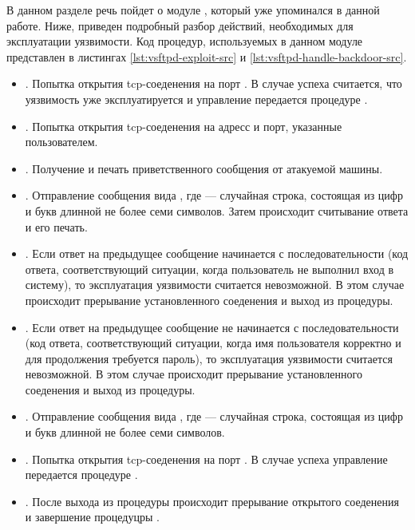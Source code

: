 В данном разделе речь пойдет о модуле , который уже упоминался в данной работе. Ниже, приведен подробный разбор действий, необходимых для эксплуатации уязвимости. Код процедур, используемых 
в данном модуле представлен в листингах \ref{lst:vsftpd-exploit-src} и \ref{lst:vsftpd-handle-backdoor-src}.
\begin{itemize}
    \item {}. Попытка открытия tcp-соеденения на порт . В случае успеха считается, что уязвимость уже эксплуатируется и управление передается процедуре .
    \item {}. Попытка открытия tcp-соеденения на адресс и порт, указанные пользователем.
    \item {}. Получение и печать приветственного сообщения от атакуемой машины.
    \item {}. Отправление сообщения вида , где  --- случайная строка, состоящая из цифр и букв длинной не более семи символов. Затем происходит считывание ответа и его 
        печать.
    \item {}. Если ответ на предыдущее сообщение начинается с последовательности  (код ответа, соответствующий ситуации, когда пользователь не выполнил вход в систему), то эксплуатация 
        уязвимости считается невозможной. В этом случае происходит прерывание установленного соеденения и выход из процедуры.
    \item {}. Если ответ на предыдущее сообщение не начинается с последовательности  (код ответа, соответствующий ситуации, когда имя пользователя корректно и для продолжения требуется пароль),
        то эксплуатация уязвимости считается невозможной. В этом случае происходит прерывание установленного соеденения и выход из процедуры.
    \item {}. Отправление сообщения вида , где  --- случайная строка, состоящая из цифр и букв длинной не более семи символов.
    \item {}. Попытка открытия tcp-соеденения на порт . В случае успеха управление передается процедуре .
    \item {}. После выхода из процедуры  происходит прерывание открытого соеденения и завершение процедуцры .
\end{itemize}

